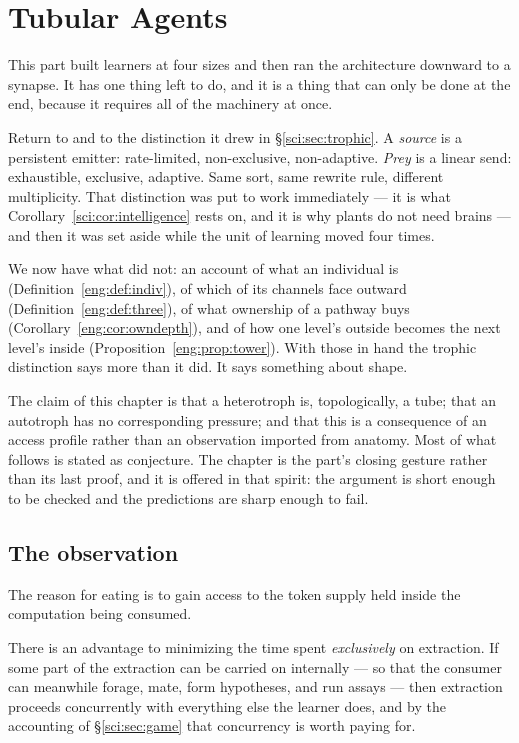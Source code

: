 \chapter{Tubular Agents}
\label{ch:tub}

This part built learners at four sizes and then ran the architecture downward
to a synapse. It has one thing left to do, and it is a thing that can only be
done at the end, because it requires all of the machinery at once.

Return to \chSci and to the distinction it drew in \S\ref{sci:sec:trophic}. A
\emph{source} is a persistent emitter: rate-limited, non-exclusive,
non-adaptive. \emph{Prey} is a linear send: exhaustible, exclusive, adaptive.
Same sort, same rewrite rule, different multiplicity. That distinction was put
to work immediately --- it is what
Corollary~\ref{sci:cor:intelligence} rests on, and it is why plants do not need
brains --- and then it was set aside while the unit of learning moved four times.

We now have what \chSci did not: an account of what an individual is
(Definition~\ref{eng:def:indiv}), of which of its channels face outward
(Definition~\ref{eng:def:three}), of what ownership of a pathway buys
(Corollary~\ref{eng:cor:owndepth}), and of how one level's outside becomes the
next level's inside (Proposition~\ref{eng:prop:tower}). With those in hand the
trophic distinction says more than it did. It says something about shape.

The claim of this chapter is that a heterotroph is, topologically, a tube; that
an autotroph has no corresponding pressure; and that this is a consequence of an
access profile rather than an observation imported from anatomy. Most of what
follows is stated as conjecture. The chapter is the part's closing gesture rather
than its last proof, and it is offered in that spirit: the argument is short
enough to be checked and the predictions are sharp enough to fail.

\section{The observation}
\label{tub:sec:obs}

The reason for eating is to gain access to the token supply held inside the
computation being consumed.

There is an advantage to minimizing the time spent \emph{exclusively} on
extraction. If some part of the extraction can be carried on internally --- so
that the consumer can meanwhile forage, mate, form hypotheses, and run assays
--- then extraction proceeds concurrently with everything else the learner does,
and by the accounting of \S\ref{sci:sec:game} that concurrency is worth paying
for.

